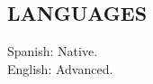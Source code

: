 \documentclass[margin, 10pt]{res} %
\begin{document}
\begin{resume}

\section{LANGUAGES}
Spanish: Native. \\
English: Advanced.

\end{resume}
\end{document}

